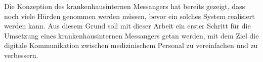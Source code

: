 Die Konzeption des krankenhausinternen Messangers hat bereits gezeigt, dass noch viele Hürden genommen werden müssen, bevor ein solches System realisiert werden kann. Aus diesem Grund soll mit dieser Arbeit ein erster Schritt für die Umsetzung eines krankenhausinternen Messangers getan werden, mit dem Ziel die digitale Kommunikation zwischen medizinischem Personal zu vereinfachen und zu verbessern. 

